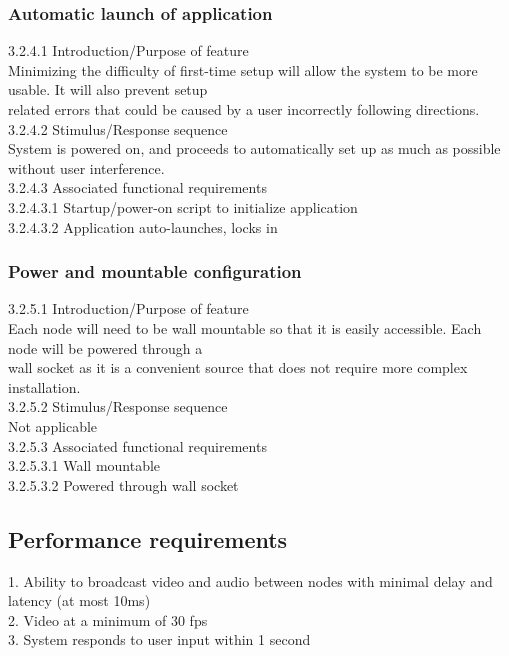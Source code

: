 \documentclass[onecolumn, draftclsnofoot,10pt, compsoc]{IEEEtran}
\newcommand\tab[1][1cm]{\hspace*{#1}}
\begin{document}
\subsubsection{Automatic launch of application}
\tab 3.2.4.1  Introduction/Purpose of feature \\
\tab Minimizing the difficulty of first-time setup will allow the system to be more usable. It will also prevent setup \\ \tab related errors that could be caused by a user incorrectly following directions. \\
\tab 3.2.4.2  Stimulus/Response sequence \\
\tab System is powered on, and proceeds to automatically set up as much as possible without user interference. \\
\tab 3.2.4.3  Associated functional requirements \\
\tab \tab 3.2.4.3.1  Startup/power-on script to initialize application \\
\tab \tab 3.2.4.3.2  Application auto-launches, locks in 

\subsubsection{Power and mountable configuration}
\tab 3.2.5.1  Introduction/Purpose of feature \\
\tab Each node will need to be wall mountable so that it is easily accessible. Each node will be powered through a \\ \tab wall socket as it is a convenient source that does not require more complex installation. \\
\tab 3.2.5.2  Stimulus/Response sequence \\
\tab Not applicable \\ 
\tab 3.2.5.3  Associated functional requirements \\
\tab \tab 3.2.5.3.1  Wall mountable \\
\tab \tab 3.2.5.3.2  Powered through wall socket

\subsection{Performance requirements}
1. Ability to broadcast video and audio between nodes with minimal delay and latency (at most 10ms) \\
2. Video at a minimum of 30 fps \\ %
3. System responds to user input within 1 second
\end{document}
